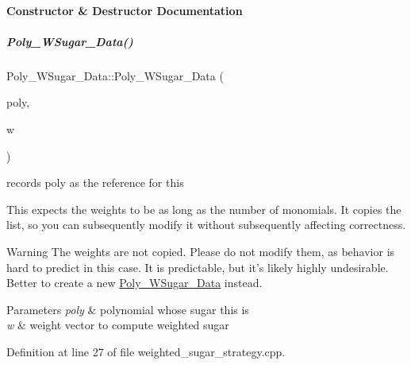 \paragraph{Constructor \& Destructor Documentation}
\mbox{\label{group__strategygroup_a1f64d0099befd970d362c0166be1b652}} 
\subparagraph{\texorpdfstring{Poly\+\_\+\+W\+Sugar\+\_\+\+Data()}{Poly\_WSugar\_Data()}}
{\footnotesize\ttfamily Poly\+\_\+\+W\+Sugar\+\_\+\+Data\+::\+Poly\+\_\+\+W\+Sugar\+\_\+\+Data (\begin{DoxyParamCaption}\item[{const \hyperlink{group__polygroup_class_abstract___polynomial}{Abstract\+\_\+\+Polynomial} $\ast$}]{poly,  }\item[{const W\+T\+\_\+\+T\+Y\+PE $\ast$}]{w }\end{DoxyParamCaption})}



records {\ttfamily poly} as the reference for {\ttfamily this} 

This expects the weights to be as long as the number of monomials. It copies the list, so you can subsequently modify it without subsequently affecting correctness. \begin{DoxyWarning}{Warning}
The weights are not copied. Please do not modify them, as behavior is hard to predict in this case. It is predictable, but it's likely highly undesirable. Better to create a new \hyperlink{group__strategygroup_class_poly___w_sugar___data}{Poly\+\_\+\+W\+Sugar\+\_\+\+Data} instead. 
\end{DoxyWarning}

\begin{DoxyParams}{Parameters}
{\em poly} & polynomial whose sugar {\ttfamily this} is \\
\hline
{\em w} & weight vector to compute weighted sugar \\
\hline
\end{DoxyParams}


Definition at line 27 of file weighted\+\_\+sugar\+\_\+strategy.\+cpp.




